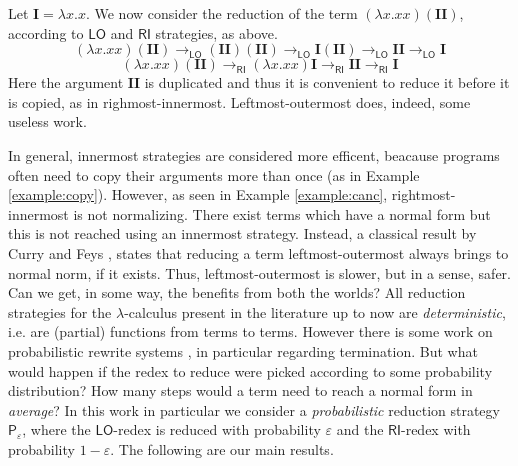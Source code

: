 \documentclass[english]{llncs}
\newcommand{\redlo}{\longrightarrow_\pslo}
\newcommand{\redri}{\longrightarrow_\psri}
\newcommand{\pslo}{\mathsf{LO}}
\newcommand{\psri}{\mathsf{RI}}
\begin{document}
\begin{example}\label{example:copy}
	Let $\bm{I}=\lambda x.x$. We now consider the reduction of the term $(\lambda x.xx)(\bm{II})$, according to $\pslo$ and $\psri$ strategies, as above.
	$$
	(\lambda x.xx)(\bm{II}) \redlo (\bm{II})(\bm{II}) \redlo \bm{I}(\bm{II}) \redlo \bm{II} \redlo \bm{I}
	$$
	$$
	(\lambda x.xx)(\bm{II}) \redri (\lambda x.xx)\bm{I} \redri \bm{II} \redri \bm{I}
	$$
	Here the argument $\bm{II}$ is duplicated and thus it is convenient to reduce it before it is copied, as in righmost-innermost. Leftmost-outermost does, indeed, some useless work.
\end{example}
In general, innermost strategies are considered more efficent, beacause programs often need to copy their arguments more than once (as in Example \ref{example:copy}). However, as seen in Example \ref{example:canc}, rightmost-innermost is not normalizing. There exist terms which have a normal form but this is not reached using an innermost strategy. Instead, a classical result by Curry and Feys \cite{curry_combinatory_1958}, states that reducing a term leftmost-outermost always brings to normal norm, if it exists. Thus, leftmost-outermost is slower, but in a sense, safer. Can we get, in some way, the benefits from both the worlds? 
All reduction strategies for the $\lambda$-calculus present in the literature up to now are \emph{deterministic}, i.e. are (partial) functions from terms to terms. However there is some work on probabilistic rewrite systems \cite{bournez_proving_2005,ferrer_fioriti_probabilistic_2015,avanzini_probabilistic_2018}, in particular regarding termination. But what would happen if the redex to reduce were picked according to some probability distribution? How many steps would a term need to reach a normal form in \emph{average}? In this work in particular we consider a \emph{probabilistic} reduction strategy $\mathsf{P}_\varepsilon$, where the $\pslo$-redex is reduced with probability $\varepsilon$ and the $\psri$-redex with probability $1-\varepsilon$. The following are our main results.
\end{document}
